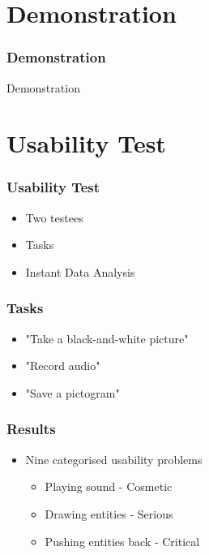 	\section{Demonstration}
	
		\begin{frame}
			\frametitle{Demonstration}
			\begin{center}
				Demonstration
			\end{center}
		\end{frame}	
		
	\section{Usability Test}
		\begin{frame}
			\frametitle{Usability Test}
			\begin{itemize}
				\item Two testees
				\item Tasks
				\item Instant Data Analysis
			\end{itemize}
		\end{frame}
		
		\begin{frame}
			\frametitle{Tasks}
			\begin{itemize}
				\item "Take a black-and-white picture"
				\item "Record audio"
				\item "Save a pictogram"
			\end{itemize}
		\end{frame}
		
		\begin{frame}
			\frametitle{Results}
			\begin{itemize}
				\item Nine categorised usability problems
				\begin{itemize}
					\item Playing sound - Cosmetic
					\item Drawing entities - Serious
					\item Pushing entities back - Critical
				\end{itemize}
			\end{itemize}
		\end{frame}